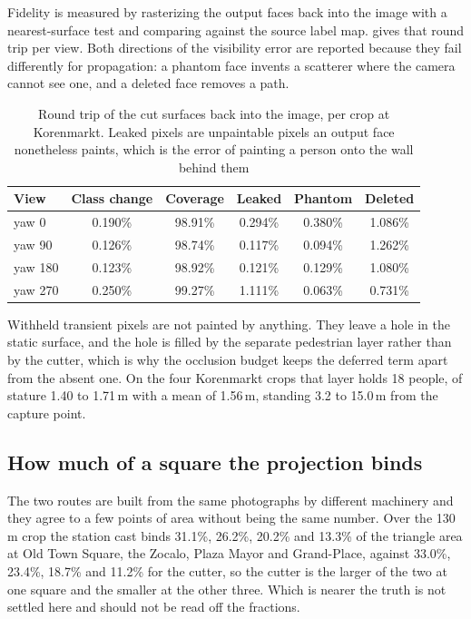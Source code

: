 \documentclass[journal]{IEEEtran}
\begin{document}
Fidelity is measured by rasterizing the output faces back into the image with a
nearest-surface test and comparing against the source label map.
 gives that round trip per view. Both directions of the
visibility error are reported because they fail differently for propagation: a
phantom face invents a scatterer where the camera cannot see one, and a deleted
face removes a path.

\begin{table}[!t]
  \caption{Round trip of the cut surfaces back into the image, per crop at
  Korenmarkt. Leaked pixels are unpaintable pixels an output face nonetheless
  paints, which is the error of painting a person onto the wall behind them}
  \label{tab:si-roundtrip}
  \centering
  \begin{tabular}{lccccc}
    \toprule
    View & Class change & Coverage & Leaked & Phantom & Deleted \\
    \midrule
    yaw 0   & 0.190\% & 98.91\% & 0.294\% & 0.380\% & 1.086\% \\
    yaw 90  & 0.126\% & 98.74\% & 0.117\% & 0.094\% & 1.262\% \\
    yaw 180 & 0.123\% & 98.92\% & 0.121\% & 0.129\% & 1.080\% \\
    yaw 270 & 0.250\% & 99.27\% & 1.111\% & 0.063\% & 0.731\% \\
    \bottomrule
  \end{tabular}
\end{table}

Withheld transient pixels are not painted by anything. They leave a hole in the
static surface, and the hole is filled by the separate pedestrian layer rather
than by the cutter, which is why the occlusion budget keeps the deferred term
apart from the absent one. On the four Korenmarkt crops that layer holds 18
people, of stature 1.40 to 1.71\,m with a mean of 1.56\,m, standing 3.2 to
15.0\,m from the capture point.

\subsection{How much of a square the projection binds}

The two routes are built from the same photographs by different machinery and
they agree to a few points of area without being the same number. Over the
130\,m crop the station cast binds 31.1\%, 26.2\%, 20.2\% and 13.3\% of the
triangle area at Old Town Square, the Zocalo, Plaza Mayor and Grand-Place,
against 33.0\%, 23.4\%, 18.7\% and 11.2\% for the cutter, so the cutter is the
larger of the two at one square and the smaller at the other three. Which is
nearer the truth is not settled here and should not be read off the fractions.
\end{document}
